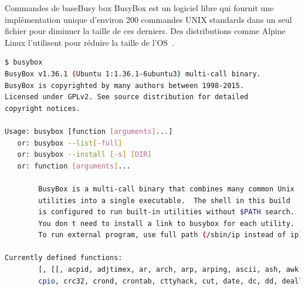 \documentclass{beamer}
\begin{document}
    \begin{frame}[fragile]{Commandes de base}{Busy box}
        BusyBox est un logiciel libre qui fournit une implémentation unique d'environ 200 commandes UNIX standards dans un seul fichier pour diminuer la taille de ces derniers.
        Des distributions comme Alpine Linux l'utilisent pour réduire la taille de l'OS~.
        \begin{lstlisting}[language=bash,basicstyle=\tiny\ttfamily]
$ busybox
BusyBox v1.36.1 (Ubuntu 1:1.36.1-6ubuntu3) multi-call binary.
BusyBox is copyrighted by many authors between 1998-2015.
Licensed under GPLv2. See source distribution for detailed
copyright notices.

Usage: busybox [function [arguments]...]
   or: busybox --list[-full]
   or: busybox --install [-s] [DIR]
   or: function [arguments]...

        BusyBox is a multi-call binary that combines many common Unix
        utilities into a single executable.  The shell in this build
        is configured to run built-in utilities without $PATH search.
        You don t need to install a link to busybox for each utility.
        To run external program, use full path (/sbin/ip instead of ip).

Currently defined functions:
        [, [[, acpid, adjtimex, ar, arch, arp, arping, ascii, ash, awk, base64, basename, bc, blkdiscard, blockdev, brctl, bunzip2, busybox, bzcat, bzip2, cal, cat, chgrp, chmod, chown, chpasswd, chroot, chvt, clear, cmp, cp,
        cpio, crc32, crond, crontab, cttyhack, cut, date, dc, dd, deallocvt, depmod, devmem, df, diff, dirname, dmesg, dnsdomainname, dos2unix, dpkg, dpkg-deb, du, dumpkmap, dumpleases, echo, ed,
        \end{lstlisting}
    \end{frame}
\end{document}
